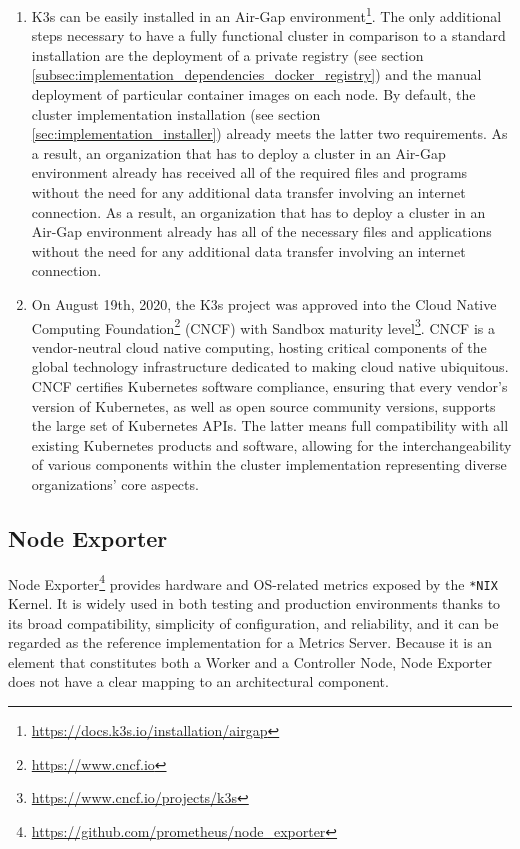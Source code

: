 \begin{enumerate}
  \item K3s can be easily installed in an Air-Gap environment\footnote{\url{https://docs.k3s.io/installation/airgap}}.
    The only additional steps necessary to have a fully functional cluster in
    comparison to a standard installation are the deployment of a private
    registry (see section \ref{subsec:implementation_dependencies_docker_registry})
    and the manual deployment of particular container images on each node.
    \newline
    By default, the cluster implementation installation (see section \ref{sec:implementation_installer})
    already meets the latter two requirements. As a result, an organization that
    has to deploy a cluster in an Air-Gap environment already has received all
    of the required files and programs without the need for any additional data
    transfer involving an internet connection. As a result, an organization that
    has to deploy a cluster in an Air-Gap environment already has all of the
    necessary files and applications without the need for any additional data
    transfer involving an internet connection.

  \item On August 19th, 2020, the K3s project was approved into the Cloud Native
    Computing Foundation\footnote{\url{https://www.cncf.io}} (CNCF) with Sandbox
    maturity level\footnote{\url{https://www.cncf.io/projects/k3s}}. CNCF is a
    vendor-neutral cloud native computing, hosting critical components of the global
    technology infrastructure dedicated to making cloud native ubiquitous. CNCF
    certifies Kubernetes software compliance, ensuring that every vendor's version
    of Kubernetes, as well as open source community versions, supports the large
    set of Kubernetes APIs. The latter means full compatibility with all
    existing Kubernetes products and software, allowing for the interchangeability
    of various components within the cluster implementation representing diverse
    organizations' core aspects.
\end{enumerate}

\subsection{Node Exporter}
\label{subsec:implementation_dependencies_node_exporter}

Node Exporter\footnote{\url{https://github.com/prometheus/node_exporter}} provides
hardware and OS-related metrics exposed by the \texttt{*NIX} Kernel. It is
widely used in both testing and production environments thanks to its broad
compatibility, simplicity of configuration, and reliability, and it can be regarded
as the reference implementation for a Metrics Server. Because it is an element
that constitutes both a Worker and a Controller Node, Node Exporter does not have
a clear mapping to an architectural component.

